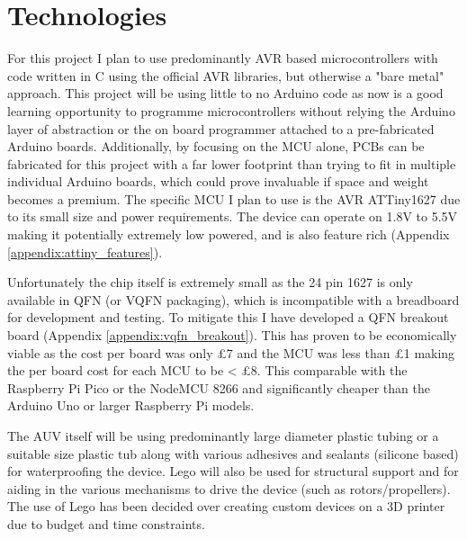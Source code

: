 \documentclass[11pt,a4paper,titlepage]{report}
\begin{document}
	\section*{Technologies}
	For this project I plan to use predominantly AVR based microcontrollers with code written in C using the official AVR libraries, but otherwise a "bare metal" approach. This project will be using little to no Arduino code as now is a good learning opportunity to programme microcontrollers without relying the Arduino layer of abstraction or the on board programmer attached to a pre-fabricated Arduino boards. Additionally, by focusing on the MCU alone, PCBs can be fabricated for this project with a far lower footprint than trying to fit in multiple individual Arduino boards, which could prove invaluable if space and weight becomes a premium. The specific MCU I plan to use is the AVR ATTiny1627\cite{ATTINY1627} due to its small size and power requirements. The device can operate on 1.8\unit{\volt} to 5.5\unit{\volt} making it potentially extremely low powered, and is also feature rich (Appendix \ref{appendix:attiny_features}).
	
	Unfortunately the chip itself is extremely small as the 24 pin 1627 is only available in QFN (or VQFN packaging), which is incompatible with a breadboard for development and testing. To mitigate this I have developed a QFN breakout board (Appendix \ref{appendix:vqfn_breakout}). This has proven to be economically viable as the cost per board was only £7 and the MCU was less than £1 making the per board cost for each MCU to be < £8. This comparable with the Raspberry Pi Pico or the NodeMCU 8266\cite{8266} and significantly cheaper than the Arduino Uno or larger Raspberry Pi models. 
	
	The AUV itself will be using predominantly large diameter plastic tubing or a suitable size plastic tub along with various adhesives and sealants (silicone based) for waterproofing the device. Lego will also be used for structural support and for aiding in the various mechanisms to drive the device (such as rotors/propellers). The use of Lego has been decided over creating custom devices on a 3D printer due to budget and time constraints.
	
\end{document}
